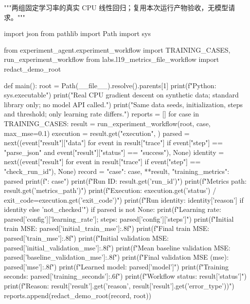 \begin{Code}
"""两组固定学习率的真实 CPU 线性回归；复用本次运行产物验收，无模型请求。"""

import json
from pathlib import Path
import sys

from experiment_agent.experiment_workflow import TRAINING_CASES, run_experiment_workflow
from labs.l19_metrics_file_workflow import redact_demo_root


def main():
    root = Path(__file__).resolve().parents[1]
    print(f"Python: {sys.executable}")
    print("Real CPU gradient descent on synthetic data; standard library only; no model API called.")
    print("Same data seeds, initialization, steps and threshold; only learning rate differs.")
    reports = []
    for case in TRAINING_CASES:
        result = run_experiment_workflow(root, case, max_mse=0.1)
        execution = result.get("execution", {})
        parsed = next((event["result"]["data"] for event in result["trace"]
                       if event["step"] == "parse_json" and event["result"]["status"] == "success"), None)
        identity = next((event["result"] for event in result["trace"] if event["step"] == "check_run_id"), None)
        record = {"case": case, **result, "training_metrics": parsed}
        print(f"\nCase: {case}")
        print(f"Run ID: {result.get('run_id')}")
        print(f"Metrics path: {result.get('metrics_path')}")
        print(f"Execution: {execution.get('status')} / exit_code={execution.get('exit_code')}")
        print(f"Run identity: {identity['reason'] if identity else 'not_checked'}")
        if parsed is not None:
            print(f"Learning rate: {parsed['config']['learning_rate']}; steps: {parsed['config']['steps']}")
            print(f"Initial train MSE: {parsed['initial_train_mse']:.8f}")
            print(f"Final train MSE: {parsed['train_mse']:.8f}")
            print(f"Initial validation MSE: {parsed['initial_validation_mse']:.8f}")
            print(f"Mean baseline validation MSE: {parsed['baseline_validation_mse']:.8f}")
            print(f"Final validation MSE (mse): {parsed['mse']:.8f}")
            print(f"Learned model: {parsed['model']}")
            print(f"Training seconds: {parsed['training_seconds']:.6f}")
        print(f"Workflow status: {result['status']}")
        print(f"Reason: {result['result'].get('reason', result['result'].get('error_type'))}")
        reports.append(redact_demo_root(record, root))


\end{Code}
